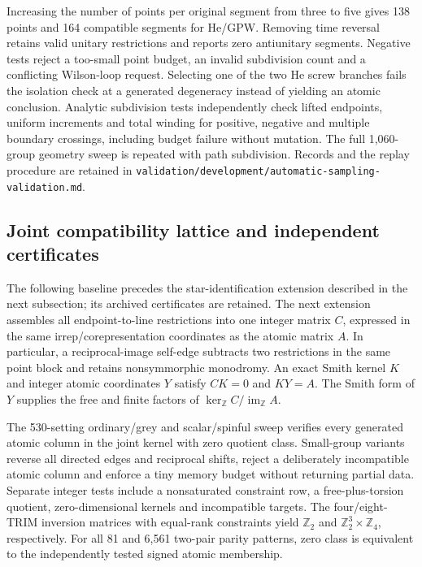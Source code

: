 \documentclass[11pt]{article}
\begin{document}
Increasing the number of points per original segment from three to
five gives 138 points and 164 compatible segments for He/GPW. Removing
time reversal retains valid unitary restrictions and reports zero
antiunitary segments. Negative tests reject a too-small point budget,
an invalid subdivision count and a conflicting Wilson-loop request.
Selecting one of the two He screw branches fails the isolation check
at a generated degeneracy instead of yielding an atomic conclusion.
Analytic subdivision tests independently check lifted endpoints,
uniform increments and total winding for positive, negative and
multiple boundary crossings, including budget failure without mutation.
The full 1,060-group geometry sweep is repeated with path subdivision.
Records and the replay procedure are retained in
\texttt{validation/development/automatic-sampling-validation.md}.

\subsection{Joint compatibility lattice and independent certificates}
The following baseline precedes the star-identification extension
described in the next subsection; its archived certificates are retained.
The next extension assembles all endpoint-to-line restrictions into
one integer matrix $C$, expressed in the same irrep/corepresentation
coordinates as the atomic matrix $A$. In particular, a reciprocal-image
self-edge subtracts two restrictions in the same point block and
retains nonsymmorphic monodromy. An exact Smith kernel $K$ and integer
atomic coordinates $Y$ satisfy $CK=0$ and $KY=A$.
The Smith form of $Y$ supplies the free and finite factors of
$\ker_{\mathbb Z}C/\operatorname{im}_{\mathbb Z}A$.

The 530-setting ordinary/grey and scalar/spinful sweep verifies every
generated atomic column in the joint kernel with zero quotient class.
Small-group variants reverse all directed edges and reciprocal shifts,
reject a deliberately incompatible atomic column and enforce a tiny
memory budget without returning partial data. Separate integer tests
include a nonsaturated constraint row, a free-plus-torsion quotient,
zero-dimensional kernels and incompatible targets. The four/eight-TRIM
inversion matrices with equal-rank constraints yield $\mathbb Z_2$
and $\mathbb Z_2^3\times\mathbb Z_4$, respectively. For all 81 and
6,561 two-pair parity patterns, zero class is equivalent to the
independently tested signed atomic membership.
\end{document}
